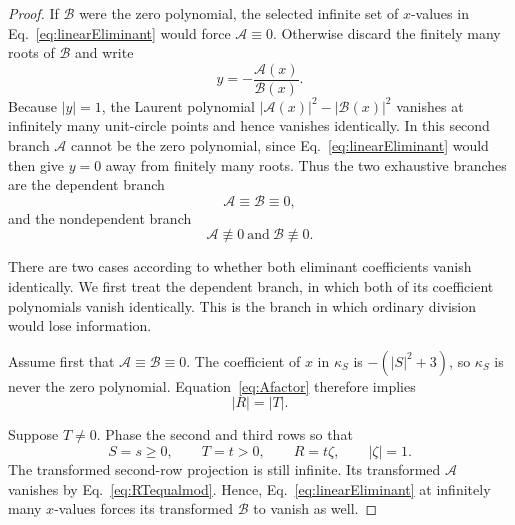 \documentclass[aps,prx,reprint,nofootinbib,twoside,superscriptaddress,longbibliography,floatfix]{revtex4-2}
\theoremstyle{definition}
\begin{document}
\begin{proof}
If $\mathcal B$ were the zero polynomial, the selected infinite set of $x$-values in Eq.~\eqref{eq:linearEliminant} would force $\mathcal A\equiv0$.  Otherwise discard the finitely many roots of $\mathcal B$ and write
\begin{equation}
y=-\frac{\mathcal A(x)}{\mathcal B(x)}.
\label{eq:yquotient}
\end{equation}
Because $|y|=1$, the Laurent polynomial $|\mathcal A(x)|^2-|\mathcal B(x)|^2$ vanishes at infinitely many unit-circle points and hence vanishes identically.  In this second branch $\mathcal A$ cannot be the zero polynomial, since Eq.~\eqref{eq:linearEliminant} would then give $y=0$ away from finitely many roots.  Thus the two exhaustive branches are the dependent branch
\begin{equation}
\mathcal A\equiv\mathcal B\equiv0,
\label{eq:dependent-branch}
\end{equation}
and the nondependent branch
\begin{equation}
\mathcal A\not\equiv0\ \text{and}\ \mathcal B\not\equiv0.
\label{eq:nondependent-branch}
\end{equation}

There are two cases according to whether both eliminant coefficients vanish identically. We first treat the dependent branch, in which both of its coefficient polynomials vanish identically. This is the branch in which ordinary division would lose information.

Assume first that $\mathcal A\equiv\mathcal B\equiv0$.  The coefficient of $x$ in $\kappa_S$ is $-(|S|^2+3)$, so $\kappa_S$ is never the zero polynomial.  Equation~\eqref{eq:Afactor} therefore implies
\begin{equation}
|R|=|T|.
\label{eq:RTequalmod}
\end{equation}

Suppose $T\neq0$.  Phase the second and third rows so that
\begin{equation}
S=s\geq0,
\qquad T=t>0,
\qquad R=t\zeta,
\qquad |\zeta|=1.
\label{eq:dependentnormalization}
\end{equation}
The transformed second-row projection is still infinite.  Its transformed $\mathcal A$ vanishes by Eq.~\eqref{eq:RTequalmod}. Hence, Eq.~\eqref{eq:linearEliminant} at infinitely many $x$-values forces its transformed $\mathcal B$ to vanish as well.


\end{proof}
\end{document}
